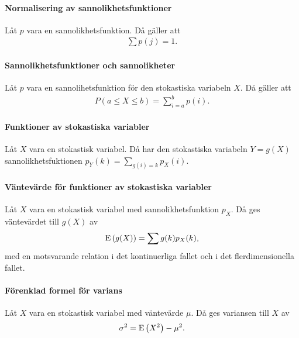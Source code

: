 \proof

\paragraph{Normalisering av sannolikhetsfunktioner}
Låt $p$ vara en sannolikhetsfunktion. Då gäller att
\begin{align*}
	\sum p(j) = 1.
\end{align*}

\proof

\paragraph{Sannolikhetsfunktioner och sannolikheter}
Låt $p$ vara en sannolihetsfunktion för den stokastiska variabeln $X$. Då gäller att
\begin{align*}
	P(a\leq X\leq b) = \sum\limits_{i = a}^{b}p(i).
\end{align*}

\proof

\paragraph{Funktioner av stokastiska variabler}
Låt $X$ vara en stokastisk variabel. Då har den stokastiska variabeln $Y = g(X)$ sannolikhetsfuktionen $p_{Y}(k) = \sum\limits_{g(i) = k}p_{X}(i)$.

\proof

\paragraph{Väntevärde för funktioner av stokastiska variabler}
Låt $X$ vara en stokastisk variabel med sannolikhetsfunktion $p_{X}$. Då ges väntevärdet till $g(X)$ av
\begin{align*}
	\text{E}\left(g(X)\right) = \sum g(k)p_{X}(k),
\end{align*}
med en motsvarande relation i det kontinuerliga fallet och i det flerdimensionella fallet.

\proof

\paragraph{Förenklad formel för varians}
Låt $X$ vara en stokastisk variabel med väntevärde $\mu$. Då ges variansen till $X$ av
\begin{align*}
	\sigma^2 = \text{E}\left(X^2\right) - \mu^2.
\end{align*}

